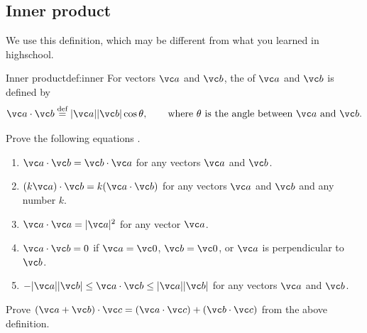 \documentclass[11pt,pdfa,lastpage]{MishoNote}
\begin{document}
\subsection{Inner product}
We use this definition, which may be different from what you learned in highschool.
\begin{definition}{Inner product}{def:inner}
  For vectors $\vc a$ and $\vc b$, the  of $\vc a$ and $\vc b$ is defined by
  \[ \vc a\cdot\vc b\defeq|\vc a||\vc b|\cos\theta, \qquad \text{where $\theta$ is the angle between $\vc a$ and $\vc b$.} \]
\end{definition}
\begin{problems}
  \Problem[A] Prove the following equations .
  \begin{enumerate}
    \item $\vc a\cdot\vc b=\vc b\cdot\vc a$ for any vectors $\vc a$ and $\vc b$.
    \item $(k\vc a)\cdot\vc b=k(\vc a\cdot\vc b)$ for any vectors $\vc a$ and $\vc b$ and any number $k$.
    \item $\vc a\cdot\vc a=|\vc a|^2$ for any vector $\vc a$.
    \item $\vc a\cdot\vc b=0$ if $\vc a=\vc 0$, $\vc b=\vc 0$, or $\vc a$ is perpendicular to $\vc b$.
    \item $-|\vc a||\vc b|\le \vc a\cdot\vc b\le|\vc a||\vc b|$ for any vectors $\vc a$ and $\vc b$.
  \end{enumerate}
  \Problem[C] Prove $(\vc a+\vc b)\cdot\vc c=(\vc a\cdot\vc c)+(\vc b\cdot\vc c)$ from the above definition. 
\end{problems}
\medskip
\noindent{}
\end{document}
